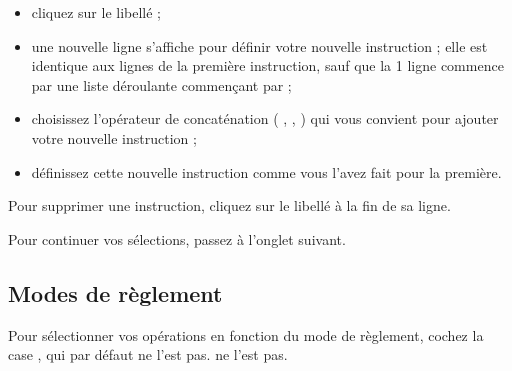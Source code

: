 \begin{itemize}
	 \item cliquez sur le libellé  ;
	 \item une nouvelle ligne s'affiche pour définir votre nouvelle instruction ; elle est identique aux lignes de la première instruction, sauf que la 1 ligne commence par une liste déroulante commençant par  ;
	 \item choisissez l'opérateur de concaténation ( ,  ,  ) qui vous convient pour ajouter votre nouvelle instruction ;
	 \item définissez cette nouvelle instruction comme vous l'avez fait pour la première.
\end{itemize}

Pour supprimer une instruction, cliquez sur le libellé  à la fin de sa ligne.


Pour continuer vos sélections, passez à l'onglet suivant.


\subsection{Modes de règlement\label{reportscreation-selection-paiementmode}}

Pour sélectionner vos opérations en fonction du mode de règlement, cochez la case  , qui par défaut 
\ifIllustration ne l'est pas.
\else ne l'est pas.
\fi

